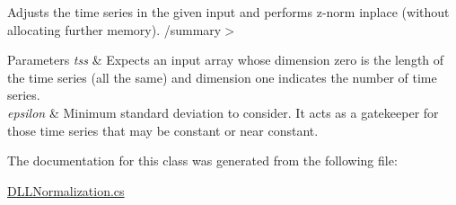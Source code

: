 Adjusts the time series in the given input and performs z-\/norm inplace (without allocating further memory). /summary$>$ 
\begin{DoxyParams}{Parameters}
{\em tss} & Expects an input array whose dimension zero is the length of the time series (all the same) and dimension one indicates the number of time series.\\
\hline
{\em epsilon} & Minimum standard deviation to consider. It acts as a gatekeeper for those time series that may be constant or near constant.\\
\hline
\end{DoxyParams}




The documentation for this class was generated from the following file\+:\begin{DoxyCompactItemize}
\item 
\mbox{\hyperlink{_d_l_l_normalization_8cs}{D\+L\+L\+Normalization.\+cs}}\end{DoxyCompactItemize}
